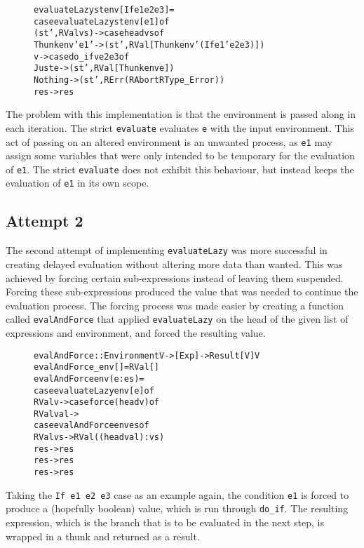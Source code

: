 \begin{figure}[H]
\begin{alltt}
  evaluateLazy st env [If e1 e2 e3]   =
    case evaluateLazy st env [e1] of
      (st', RVal vs)   -> case head vs of
        Thunk env' e1' -> (st', RVal [Thunk env' (If e1' e2 e3)])
        v              -> case do_if v e2 e3 of
          Just e  -> (st', RVal [Thunk env e])
          Nothing -> (st', RErr (RAbort RType_Error))
      res -> res
\end{alltt}
\end{figure}

The problem with this implementation is that the environment is passed along
in each iteration. The strict \texttt{evaluate} evaluates \texttt{e} with
the input environment. This act of passing on an altered environment is an
unwanted process, as \texttt{e1} may assign some variables that were only
intended to be temporary for the evaluation of \texttt{e1}. The strict
\texttt{evaluate} does not exhibit this behaviour, but instead keeps the
evaluation of \texttt{e1} in its own scope.

\subsection{Attempt 2}
\label{lazySem:att2}
The second attempt of implementing \texttt{evaluateLazy} was more successful
in creating delayed evaluation without altering more data than wanted. This
was achieved by forcing certain sub-expressions instead of leaving them
suspended. Forcing these sub-expressions produced the value that was needed
to continue the evaluation process. The forcing process was made easier by
creating a function called \texttt{evalAndForce} that applied
\texttt{evaluateLazy} on the head of the given list of expressions and
environment, and forced the resulting value.

\begin{figure}[H]
\begin{alltt}
  evalAndForce :: Environment V -> [Exp] -> Result [V] V
  evalAndForce _env []    = RVal []
  evalAndForce env (e:es) =
    case evaluateLazy env [e] of
      RVal v -> case force (head v) of
        RVal val ->
          case evalAndForce env es of
            RVal vs -> RVal ((head val):vs)
            res -> res
        res -> res
      res -> res
\end{alltt}
\end{figure}

Taking the \texttt{If e1 e2 e3} case as an example again, the condition
\texttt{e1} is forced to produce a (hopefully boolean) value, which is run
through \texttt{do\_if}. The resulting expression, which is the branch that is
to be evaluated in the next step, is wrapped in a thunk and returned as a
result.

